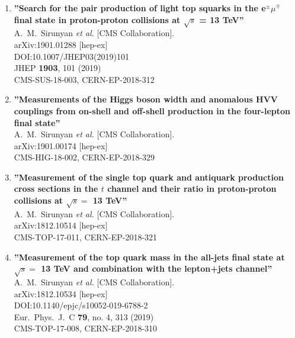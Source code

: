 \begin{enumerate}
\item%
{\bf ''Search for the pair production of light top squarks in the e$^{\pm}\mu^{\mp}$ final state in proton-proton collisions at $\sqrt{s}$ = 13 TeV''}
  \\{}A.~M.~Sirunyan {\it et al.} [CMS Collaboration].
  \\{}arXiv:1901.01288 [hep-ex]
  \\{}DOI:10.1007/JHEP03(2019)101
  \\{}JHEP {\bf 1903}, 101 (2019)
  \\{}CMS-SUS-18-003, CERN-EP-2018-312

\item%
{\bf ''Measurements of the Higgs boson width and anomalous HVV couplings from on-shell and off-shell production in the four-lepton final state''}
  \\{}A.~M.~Sirunyan {\it et al.} [CMS Collaboration].
  \\{}arXiv:1901.00174 [hep-ex]
  \\{}CMS-HIG-18-002, CERN-EP-2018-329

\item%
{\bf ''Measurement of the single top quark and antiquark production cross sections in the $t$ channel and their ratio in proton-proton collisions at $\sqrt{s}=$ 13 TeV''}
  \\{}A.~M.~Sirunyan {\it et al.} [CMS Collaboration].
  \\{}arXiv:1812.10514 [hep-ex]
  \\{}CMS-TOP-17-011, CERN-EP-2018-321

\item%
{\bf ''Measurement of the top quark mass in the all-jets final state at $\sqrt{s} =$ 13 TeV and combination with the lepton+jets channel''}
  \\{}A.~M.~Sirunyan {\it et al.} [CMS Collaboration].
  \\{}arXiv:1812.10534 [hep-ex]
  \\{}DOI:10.1140/epjc/s10052-019-6788-2
  \\{}Eur.\ Phys.\ J.\ C {\bf 79}, no. 4, 313 (2019)
  \\{}CMS-TOP-17-008, CERN-EP-2018-310


\end{enumerate}
